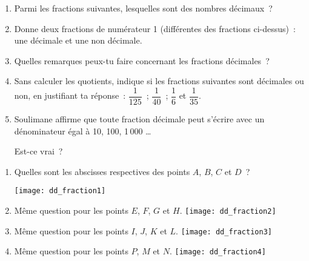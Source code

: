 \begin{exercice}
\begin{enumerate}
 \item Parmi les fractions suivantes, lesquelles sont des nombres décimaux ?
 \item Donne deux fractions de numérateur 1 (différentes des fractions ci-dessus) : une  décimale et une non décimale.
 \item Quelles remarques peux-tu faire concernant les fractions décimales ?
 \item Sans calculer les quotients, indique si les fractions suivantes sont décimales ou non, en justifiant ta réponse : $\dfrac{1}{125}$ ; $\dfrac{1}{40}$ ; $\dfrac{1}{6}$ et $\dfrac{1}{35}$.
 \vspace{0.2cm}
 \item Soulimane affirme que toute fraction décimale peut s'écrire avec un dénominateur égal à 10, 100, 1\,000 \ldots
 
 Est-ce vrai ?
 \end{enumerate}
\end{exercice}


\begin{exercice}
\begin{enumerate}
 \item Quelles sont les abscisses respectives des points $A$, $B$, $C$ et $D$ ?
 
 \texttt{[image: dd\_fraction1]}
 \item Même question pour les points $E$, $F$, $G$ et $H$.
 \texttt{[image: dd\_fraction2]}
 \item Même question pour les points $I$, $J$, $K$ et $L$.
 \texttt{[image: dd\_fraction3]}
 \item Même question pour les points $P$, $M$ et $N$.
 \texttt{[image: dd\_fraction4]}
 \end{enumerate}
\end{exercice}


